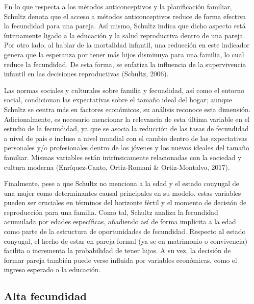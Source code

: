 \documentclass[Royal,times,sageh]{sagej}
\begin{document}
En lo que respecta a los métodos anticonceptivos y la planificación
familiar, Schultz denota que el acceso a métodos anticonceptivos reduce
de forma efectiva la fecundidad para una pareja. Así mismo, Schultz
indica que dicho aspecto está íntimamente ligado a la educación y la
salud reproductiva dentro de una pareja. Por otro lado, al hablar de la
mortalidad infantil, una reducción en este indicador genera que la
esperanza por tener más hijos disminuya para una familia, lo cual reduce
la fecundidad. De esta forma, se enfatiza la influencia de la
supervivencia infantil en las decisiones reproductivas (Schultz, 2006).

Las normas sociales y culturales sobre familia y fecundidad, así como el
entorno social, condicionan las expectativas sobre el tamaño ideal del
hogar; aunque Schultz se centra más en factores económicos, su análisis
reconoce esta dimensión. Adicionalmente, es necesario mencionar la
relevancia de esta última variable en el estudio de la fecundidad, ya
que se asocia la reducción de las tasas de fecundidad a nivel de país e
incluso a nivel mundial con el cambio dentro de las expectativas
personales y/o profesionales dentro de los jóvenes y los nuevos ideales
del tamaño familiar. Mismas variables están intrínsicamente relacionadas
con la sociedad y cultura moderna (Enríquez-Canto, Ortiz-Romaní \&
Ortiz-Montalvo, 2017).

Finalmente, pese a que Schultz no menciona a la edad y el estado
conyugal de una mujer como determinantes causal principales en su
modelo, estas variables pueden ser cruciales en términos del horizonte
fértil y el momento de decisión de reproducción para una familia. Como
tal, Schultz analiza la fecundidad acumulada por edades específicas,
añadiendo así de forma implícita a la edad como parte de la estructura
de oportunidades de fecundidad. Respecto al estado conyugal, el hecho de
estar en pareja formal (ya se en matrimonio o convivencia) facilita o
incrementa la probabilidad de tener hijos. A su vez, la decisión de
formar pareja también puede verse influida por variables económicas,
como el ingreso esperado o la educación.

\subsection{Alta fecundidad}\label{alta-fecundidad}
\end{document}
